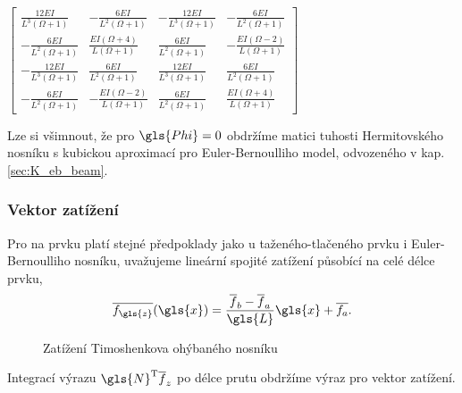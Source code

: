     $\displaystyle \left[\begin{matrix}\frac{12 E I}{L^{3} \left(\Omega + 1\right)} & - \frac{6 E I}{L^{2} \left(\Omega + 1\right)} & - \frac{12 E I}{L^{3} \left(\Omega + 1\right)} & - \frac{6 E I}{L^{2} \left(\Omega + 1\right)}\\- \frac{6 E I}{L^{2} \left(\Omega + 1\right)} & \frac{E I \left(\Omega + 4\right)}{L \left(\Omega + 1\right)} & \frac{6 E I}{L^{2} \left(\Omega + 1\right)} & - \frac{E I \left(\Omega - 2\right)}{L \left(\Omega + 1\right)}\\- \frac{12 E I}{L^{3} \left(\Omega + 1\right)} & \frac{6 E I}{L^{2} \left(\Omega + 1\right)} & \frac{12 E I}{L^{3} \left(\Omega + 1\right)} & \frac{6 E I}{L^{2} \left(\Omega + 1\right)}\\- \frac{6 E I}{L^{2} \left(\Omega + 1\right)} & - \frac{E I \left(\Omega - 2\right)}{L \left(\Omega + 1\right)} & \frac{6 E I}{L^{2} \left(\Omega + 1\right)} & \frac{E I \left(\Omega + 4\right)}{L \left(\Omega + 1\right)}\end{matrix}\right]$

\vspace{0.3cm}
Lze si všimnout, že pro $\gls{Phi} = 0$ obdržíme matici tuhosti Hermitovského nosníku s kubickou aproximací pro Euler-Bernoulliho model, odvozeného v kap. \ref{sec:K_eb_beam}.
        

\subsubsection*{Vektor zatížení}

Pro na prvku platí stejné předpoklady jako u taženého-tlačeného prvku i Euler-Bernoulliho nosníku,
uvažujeme lineární spojité zatížení působící na celé délce prvku,
\begin{equation}
    \overline{f_{\gls{z}}}(\gls{x}) = \frac{\overline{f}_b - \overline{f}_a}{\gls{L}} \gls{x} + \overline{f_a}.
\end{equation}
\begin{figure}[H]
    
    \caption{Zatížení Timoshenkova ohýbaného nosníku}
    \label{fig:tim_beam_load}
\end{figure}        

Integrací výrazu $\gls{N}^\mathrm{T} \overline{f}_z$ po délce prutu obdržíme výraz pro vektor zatížení.

